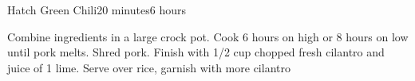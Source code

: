 \begin{recipe}{Hatch Green Chili}{20 minutes}{6 hours}

Combine ingredients in a large crock pot. Cook 6 hours on high or 8 hours on
low until pork melts. Shred pork. Finish with 1/2 cup chopped fresh cilantro
and juice of 1 lime. Serve over rice, garnish with more cilantro
\end{recipe}
